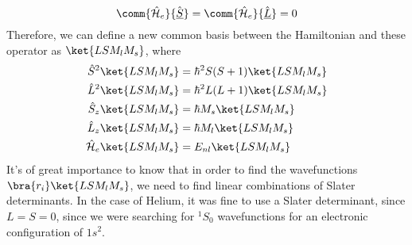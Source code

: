 \documentclass[../qm.tex]{subfiles}
\begin{document}
	\begin{equation}
		\comm{\opr{\ham}_e}{\vecopr{S}}=\comm{\opr{\ham}_e}{\vecopr{L}}=0
		\label{eq:totaangularmommanyelec}
	\end{equation}
	Therefore, we can define a new common basis between the Hamiltonian and these operator as $\ket{LSM_lM_s}$, where
	\begin{equation}
		\begin{aligned}
			\opr{S}^2\ket{LSM_lM_s}&=\hbar^2S(S+1)\ket{LSM_lM_s}\\
			\opr{L}^2\ket{LSM_lM_s}&=\hbar^2L(L+1)\ket{LSM_lM_s}\\
			\opr{S}_z\ket{LSM_lM_s}&=\hbar M_s\ket{LSM_lM_s}\\
			\opr{L}_z\ket{LSM_lM_s}&=\hbar M_l\ket{LSM_lM_s}\\
			\opr{\ham}_e\ket{LSM_lM_s}&=E_{nl}\ket{LSM_lM_s}
		\end{aligned}
		\label{eq:eigenvalueselectronmanyham}
	\end{equation}
	It's of great importance to know that in order to find the wavefunctions $\bra{r_i}\ket{LSM_lM_s}$, we need to find linear combinations of Slater determinants. In the case of Helium, it was fine to use a Slater determinant, since $L=S=0$, since we were searching for $^1S_0$ wavefunctions for an electronic configuration of $1s^2$.
\end{document}
